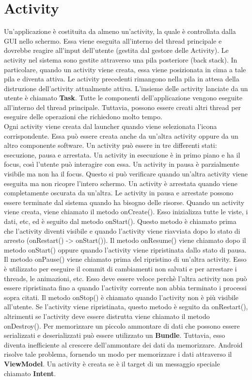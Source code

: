 \section{Activity}
Un'applicazione è costituita da almeno un'activity, la quale è controllata dalla GUI nello schermo. Essa viene eseguita all'interno del thread principale e dovrebbe reagire all'input dell'utente (gestita dal gestore delle Activity). Le activity nel sistema sono gestite attraverso una pila posteriore (back stack). In particolare, quando un activity viene creata, essa viene posizionata in cima a tale pila e diventa attiva. Le activity precedenti rimangono nella pila in attesa della distruzione dell'activity attualmente attiva. L'insieme delle activity lanciate da un utente è chiamato \textbf{Task}. Tutte le componenti dell'applicazione vengono eseguite all'interno del thread principale. Tuttavia, possono essere creati altri thread per eseguire delle operazioni che richiedono molto tempo. \\Ogni activity viene creata dal launcher quando viene selezionata l'icona corrispondente. Essa può essere creata anche da un'altra activity oppure da un altro componente software. Un activity può essere in tre differenti stati: esecuzione, pausa e arrestata. Un activity in esecuzione è in primo piano e ha il focus, così l'utente può interagire con essa. Un activity in pausa è parzialmente visibile ma non ha il focus. Questo si può verificare quando un'altra activity viene eseguita ma non ricopre l'intero schermo. Un activity è arrestata quando viene completamente oscurata da un'altra. Le activity in pausa e arrestate possono essere terminate dal sistema quando ha bisogno delle risorse. Quando un activity viene creata, viene chiamato il metodo onCreate(). Esso inizializza tutte le viste, i dati, etc, ed è seguito dal metodo onStart(). Questo metodo è chiamato prima che l'activity diventi visibile e quando l'activity viene riavviata dopo lo stato di arresto (onRestart() -> onStart()). Il metodo onResume() viene chiamato dopo il metodo onStart() oppure quando l'activity viene ripristinata dallo stato di pausa. Il metodo onPause() viene chiamato prima del ripristino di un'altra activity. Esso è utilizzato per eseguire il commit di cambiamenti non salvati e per arrestare i threads, le animazioni, etc. Esso deve essere veloce perchè l'altra activity non può essere ripristinata fino a quando l'activity corrente non abbia terminato i processi sopra citati. Il metodo onStop() è chiamato quando l'activity non è più visibile all'utente. Se l'activity viene ripristinata, questo metodo è seguito da onRestart(), altrimenti se l'activity deve essere distrutta viene chiamato il metodo onDestroy(). Per memorizzare un piccolo ammontare di dati che possono essere serializzati e deserializzati può essere utilizzato un \textbf{Bundle}. Tuttavia, esso diventa inefficiente al crescere dell'ammontare dei dati da memorizzare. Android risolve tale problema, fornendo un modo per memorizzare i dati attraverso il \textbf{ViewModel}. Un activity è creata se è il target di un messaggio speciale chiamato \textbf{Intent}.
